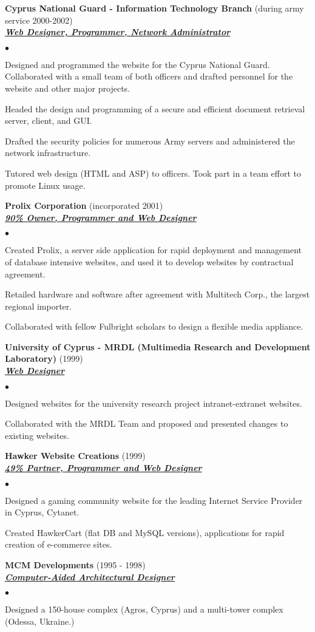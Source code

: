 \documentclass{article}
\newcommand{\employer}[3]{{ \textbf{#1} (#2)\\ \underline{\textbf{\emph{#3}}}\\  }}
\newenvironment{achievements}{\begin{list}{$\bullet$}{\topsep 0pt \itemsep -2pt}}{\vspace*{4pt}\end{list}}
\begin{document}
\employer{Cyprus National Guard - Information Technology Branch}{during army service 2000-2002} {Web Designer, Programmer, Network Administrator}
	\begin{achievements}
	\item Designed and programmed the website for the Cyprus National Guard. Collaborated with a small team of both officers and drafted personnel for the website and other major projects.
	\item Headed the design and programming of a secure and efficient document retrieval server, client, and GUI.
	\item Drafted the security policies for numerous Army servers and administered the network infrastructure.
	\item Tutored web design (HTML and ASP) to officers. Took part in a team effort to promote Linux usage.
	\end{achievements}

\employer{Prolix Corporation}{incorporated 2001}{90\% Owner, Programmer and Web Designer}
	\begin{achievements}
	\item Created Prolix, a server side application for rapid deployment and management of database intensive websites, and used it to develop websites by contractual agreement.
	\item Retailed hardware and software after agreement with Multitech Corp., the largest regional importer.
	\item Collaborated with fellow Fulbright scholars to design a flexible media appliance.
	\end{achievements}

\employer{University of Cyprus - MRDL (Multimedia Research and Development Laboratory)}{1999}
	{Web Designer}
	\begin{achievements}
	\item Designed websites for the university research project intranet-extranet websites.
	\item Collaborated with the MRDL Team and proposed and presented changes to existing websites.
	\end{achievements}

\employer{Hawker Website Creations}{1999}{49\% Partner, Programmer and Web Designer}
	\begin{achievements}
	\item Designed a gaming community website for the leading Internet Service Provider in Cyprus, Cytanet.
	\item Created HawkerCart (flat DB and MySQL versions), applications for rapid creation of e-commerce sites.
	\end{achievements}
	\employer{MCM Developments}{1995 - 1998}{Computer-Aided Architectural Designer}
	\begin{achievements}
	\item Designed a 150-house complex (Agros, Cyprus) and a multi-tower complex (Odessa, Ukraine.)
	\end{achievements}
\end{document}
